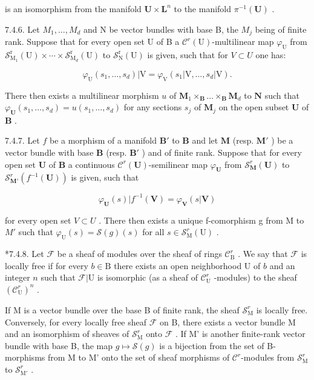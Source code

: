 is an isomorphism from the manifold \(\mathbf{U} \times \mathbf{L}^{n}\) to the manifold \(\pi^{-1}(\mathbf{U})\) .

7.4.6. Let \(M_{1},\ldots,M_{d}\) and N be vector bundles with base B, the \(M_{j}\) being of finite rank. Suppose that for every open set U of B a \(\mathcal{C}^{r}(\mathrm{U})\)-multilinear map \(\varphi_{\mathrm{U}}\) from \(\mathcal{S}_{\mathrm{M}_{1}}^{\mathrm{r}}(\mathrm{U})\times\cdots\times\mathcal{S}_{\mathrm{M}_{d}}^{\mathrm{r}}(\mathrm{U})\) to \(\mathcal{S}_{\mathrm{N}}^{\mathrm{r}}(\mathrm{U})\) is given, such that for \(V \subset U\) one has:

\[
\varphi_ {\mathrm{U}} (s _ {1}, \dots , s _ {d}) | \mathrm{V} = \varphi_ {\mathrm{V}} (s _ {1} | \mathrm{V}, \dots , s _ {d} | \mathrm{V}).
\]

There then exists a multilinear morphism \(u\) of \(\mathbf{M}_1 \times_{\mathbf{B}} \ldots \times_{\mathbf{B}} \mathbf{M}_d\) to \(\mathbf{N}\) such that \(\varphi_{\mathbf{U}}(s_1, \ldots, s_d) = u(s_1, \ldots, s_d)\) for any sections \(s_j\) of \(\mathbf{M}_j\) on the open subset \(\mathbf{U}\) of \(\mathbf{B}\) .

7.4.7. Let \(f\) be a morphism of a manifold \(\mathbf{B}'\) to \(\mathbf{B}\) and let \(\mathbf{M}\) (resp. \(\mathbf{M}'\) ) be a vector bundle with base \(\mathbf{B}\) (resp. \(\mathbf{B}'\) ) and of finite rank. Suppose that for every open set \(\mathbf{U}\) of \(\mathbf{B}\) a continuous \(\mathcal{C}^{r}(\mathbf{U})\)-semilinear map \(\varphi_{\mathbf{U}}\) from \(\mathcal{S}_{\mathbf{M}}^{r}(\mathbf{U})\) to \(\mathcal{S}_{\mathbf{M}'}^{r}(f^{-1}(\mathbf{U}))\) is given, such that

\[
\varphi_ {\mathbf {U}} (s) | f ^ {- 1} (\mathbf {V}) = \varphi_ {\mathbf {V}} (s | \mathbf {V})
\]

for every open set \(V \subset U\) . There then exists a unique f-comorphism g from M to \(M'\) such that \(\varphi_{\mathrm{U}}(s) = \mathcal{S}(g)(s)\) for all \(s \in \mathcal{S}_{\mathrm{M}}^{r}(\mathrm{U})\) .

*7.4.8. Let \(\mathcal{F}\) be a sheaf of modules over the sheaf of rings \(\mathcal{C}_{\mathrm{B}}^{r}\) . We say that \(\mathcal{F}\) is locally free if for every \(b \in \mathrm{B}\) there exists an open neighborhood U of \(b\) and an integer \(n\) such that \(\mathcal{F}|\mathrm{U}\) is isomorphic (as a sheaf of \(\mathcal{C}_{\mathrm{U}}^{r}\) -modules) to the sheaf \((\mathcal{C}_{\mathrm{U}}^{r})^{n}\) .

If M is a vector bundle over the base B of finite rank, the sheaf \(\mathcal{S}_{\mathrm{M}}^{r}\) is locally free. Conversely, for every locally free sheaf \(\mathcal{F}\) on B, there exists a vector bundle M and an isomorphism of sheaves of \(\mathcal{S}_{\mathrm{M}}^{r}\) onto \(\mathcal{F}\) . If M' is another finite-rank vector bundle with base B, the map \(g \mapsto \mathcal{S}(g)\) is a bijection from the set of B-morphisms from M to M' onto the set of sheaf morphisms of \(\mathcal{C}^{r}\)-modules from \(\mathcal{S}_{\mathrm{M}}^{r}\) to \(\mathcal{S}_{\mathrm{M}'}^{r}\) .

